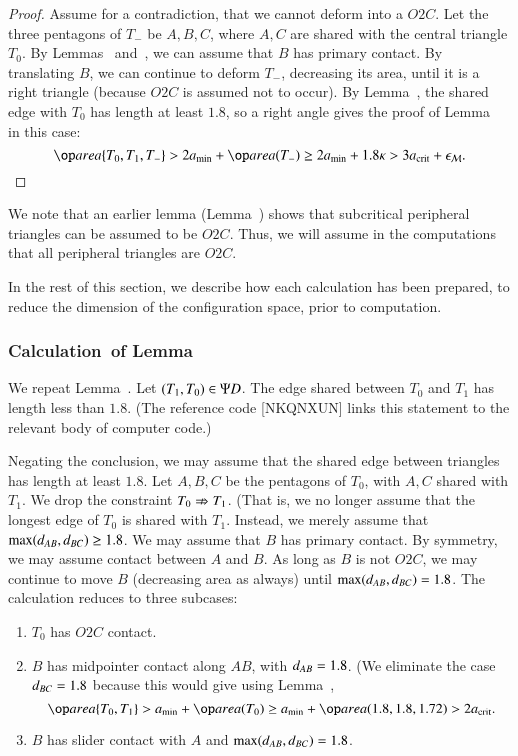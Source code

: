 \begin{proof} 
  Assume for a contradiction, that we cannot deform into a $O2C$.  Let
  the three pentagons of $T_-$ be $A,B,C$, where $A,C$ are shared with
  the central triangle $T_0$.  By Lemmas~
  and~, we can assume that $B$ has primary
  contact.  By translating $B$, we can continue to deform $T_-$,
  decreasing its area, until it is a right triangle (because $O2C$ is
  assumed not to occur).  By Lemma~, the shared edge
  with $T_0$ has length at least $1.8$, so a right angle gives the
  proof of Lemma~ in this case:
\[
\area\{T_0,T_1,T_-\} > 2\ao + \area(T_-) 
\ge 2\ao + 1.8\kappa > 3\acrit + \epsM.
\]
\end{proof}


We note that an earlier lemma (Lemma~) shows that
subcritical peripheral triangles can be assumed to be $O2C$. Thus, we
will assume in the computations that all peripheral triangles are
$O2C$.

In the rest of this section, we describe how each calculation has been
prepared, to reduce the dimension of the configuration space, prior to
computation.

\subsubsection{Calculation~of Lemma~} 

We repeat Lemma~.  Let $(T_1,T_0)\in \Psi D$.  The edge
shared between $T_0$ and $T_1$ has length less than $1.8$.  (The
reference code [NKQNXUN] links this statement to the relevant body of
computer code.)

Negating the conclusion, we may assume that the shared edge between
triangles has length at least $1.8$.  Let $A,B,C$ be the pentagons of
$T_0$, with $A,C$ shared with $T_1$.  We drop the constraint $T_0\nRightarrow
T_1$.  (That is, we no longer assume that the longest edge of $T_0$ is
shared with $T_1$.  Instead, we merely assume that
$\max(d_{AB},d_{BC})\ge 1.8$.  We may assume that $B$ has primary
contact. By symmetry, we may assume contact between $A$ and $B$.  As
long as $B$ is not $O2C$, we may continue to move $B$ (decreasing area
as always) until $\max(d_{AB},d_{BC})=1.8$.  The calculation reduces
to three subcases:
\begin{enumerate}
\item $T_0$ has $O2C$ contact.
\item $B$ has midpointer contact along $AB$, with $d_{AB}=1.8$.  (We
  eliminate the case $d_{BC}=1.8$ because this would give using
  Lemma~,
\[
\area\{T_0,T_1\} > \ao + \area(T_0) \ge \ao + \area(1.8,1.8,1.72) > 2\acrit.
\]
\item $B$ has slider contact with $A$ and $\max(d_{AB},d_{BC})=1.8$.
\end{enumerate}

